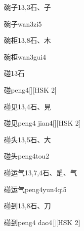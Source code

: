 \begin{entry}{碗子}{13,3}{⽯、⼦}
  \begin{phonetics}{碗子}{wan3zi5}
  \end{phonetics}
\end{entry}

\begin{entry}{碗柜}{13,8}{⽯、⽊}
  \begin{phonetics}{碗柜}{wan3gui4}
  \end{phonetics}
\end{entry}

\begin{entry}{碰}{13}{⽯}
  \begin{phonetics}{碰}{peng4}[][HSK 2]
  \end{phonetics}
\end{entry}

\begin{entry}{碰见}{13,4}{⽯、⾒}
  \begin{phonetics}{碰见}{peng4 jian4}[][HSK 2]
  \end{phonetics}
\end{entry}

\begin{entry}{碰头}{13,5}{⽯、⼤}
  \begin{phonetics}{碰头}{peng4tou2}
  \end{phonetics}
\end{entry}

\begin{entry}{碰运气}{13,7,4}{⽯、⾡、⽓}
  \begin{phonetics}{碰运气}{peng4yun4qi5}
  \end{phonetics}
\end{entry}

\begin{entry}{碰到}{13,8}{⽯、⼑}
  \begin{phonetics}{碰到}{peng4 dao4}[][HSK 2]
  \end{phonetics}
\end{entry}

